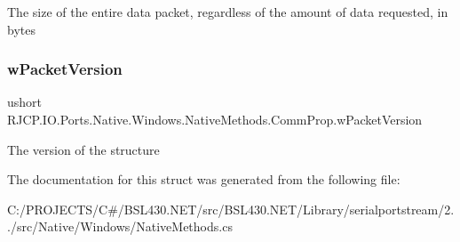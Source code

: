The size of the entire data packet, regardless of the amount of data requested, in bytes 

\mbox{\label{struct_r_j_c_p_1_1_i_o_1_1_ports_1_1_native_1_1_windows_1_1_native_methods_1_1_comm_prop_a579629c742ed914537ca579f201c3ba3}} 
\subsubsection{\texorpdfstring{wPacketVersion}{wPacketVersion}}
{\footnotesize\ttfamily ushort R\+J\+C\+P.\+I\+O.\+Ports.\+Native.\+Windows.\+Native\+Methods.\+Comm\+Prop.\+w\+Packet\+Version}



The version of the structure 



The documentation for this struct was generated from the following file\+:\begin{DoxyCompactItemize}
\item 
C\+:/\+P\+R\+O\+J\+E\+C\+T\+S/\+C\#/\+B\+S\+L430.\+N\+E\+T/src/\+B\+S\+L430.\+N\+E\+T/\+Library/serialportstream/2../src/\+Native/\+Windows/Native\+Methods.\+cs\end{DoxyCompactItemize}
